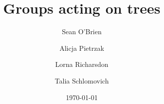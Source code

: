 \documentclass[reqno]{amsart}
\begin{document}
\title{Groups acting on trees}


\author{Sean O'Brien}
\author{Alicja Pietrzak}
\author{Lorna Richarsdon}
\author{Talia Schlomovich}



\date{\today}



\maketitle

\tableofcontents

\newpage










\end{document}
